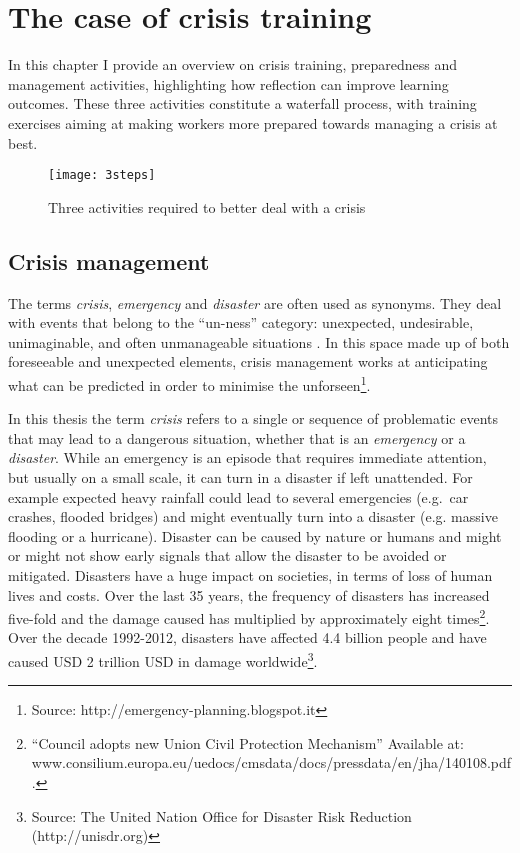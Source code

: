 \chapter{The case of crisis training}\label{crisis}

In this chapter I provide an overview on crisis training, preparedness and management activities, highlighting how reflection can improve learning outcomes. These three activities constitute a waterfall process, with training exercises aiming at making workers more prepared towards managing a crisis at best.

\begin{figure}
	[h!] \centering 
	\texttt{[image: 3steps]} \caption{Three activities required to better deal with a crisis} \label{fig:three-stages} 
\end{figure}


\section{Crisis management}\label{crisis-management}

The terms \emph{crisis}, \emph{emergency} and \emph{disaster} are often used as synonyms. They deal with events that belong to the ``un-ness'' category: unexpected, undesirable, unimaginable, and often unmanageable situations \autocites{Boin:2007wt}{hewit}. In this space made up of both foreseeable and unexpected elements, crisis management works at anticipating what can be predicted in order to minimise the unforseen\footnote{Source: http://emergency-planning.blogspot.it}.

In this thesis the term \emph{crisis} refers to a single or sequence of problematic events that may lead to a dangerous situation, whether that is an \emph{emergency} or a \emph{disaster}. While an emergency is an episode that requires immediate attention, but usually on a small scale, it can turn in a disaster if left unattended. For example expected heavy rainfall could lead to several emergencies (e.g.~car crashes, flooded bridges) and might eventually turn into a disaster (e.g. massive flooding or a hurricane). Disaster can be caused by nature or humans and might or might not show early signals that allow the disaster to be avoided or mitigated. Disasters have a huge impact on societies, in terms of loss of human lives and costs. Over the last 35 years, the frequency of disasters has increased five-fold and the damage caused has multiplied by approximately eight times\footnote{``Council adopts new Union Civil Protection Mechanism'' Available at: www.consilium.europa.eu/uedocs/cmsdata/docs/pressdata/en/jha/140108.pdf.}. Over the decade 1992-2012, disasters have affected 4.4 billion people and have caused USD 2 trillion USD in damage worldwide\footnote{Source: The United Nation Office for Disaster Risk Reduction (http://unisdr.org)}.


